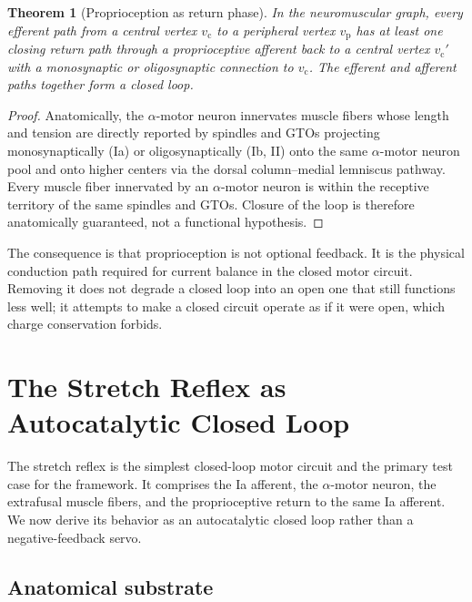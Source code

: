 \documentclass[11pt,twocolumn,a4paper]{article}
\newtheorem{theorem}{Theorem}[section]
\theoremstyle{definition}
\theoremstyle{remark}
\begin{document}
\begin{theorem}[Proprioception as return phase]
\label{thm:prop-return}
In the neuromuscular graph, every efferent path from a central vertex
$v_{\mathrm{c}}$ to a peripheral vertex $v_{\mathrm{p}}$ has at least
one closing return path through a proprioceptive afferent
back to a central vertex $v_{\mathrm{c}}'$ with a monosynaptic or
oligosynaptic connection to $v_{\mathrm{c}}$. The efferent and afferent
paths together form a closed loop.
\end{theorem}

\begin{proof}
Anatomically, the $\alpha$-motor neuron innervates muscle fibers whose
length and tension are directly reported by spindles and GTOs projecting
monosynaptically (Ia) or oligosynaptically (Ib, II) onto the same
$\alpha$-motor neuron pool and onto higher centers via the dorsal
column--medial lemniscus pathway. Every muscle fiber innervated by an
$\alpha$-motor neuron is within the receptive territory of the same
spindles and GTOs. Closure of the loop is therefore anatomically
guaranteed, not a functional hypothesis.
\end{proof}

The consequence is that proprioception is not optional feedback. It
is the physical conduction path required for current balance in the
closed motor circuit. Removing it does not degrade a closed loop into
an open one that still functions less well; it attempts to make a
closed circuit operate as if it were open, which charge conservation
forbids.


\section{The Stretch Reflex as Autocatalytic Closed Loop}
\label{sec:stretch-reflex}

The stretch reflex is the simplest closed-loop motor circuit and the
primary test case for the framework. It comprises the Ia afferent, the
$\alpha$-motor neuron, the extrafusal muscle fibers, and the
proprioceptive return to the same Ia afferent. We now derive its
behavior as an autocatalytic closed loop rather than a negative-feedback
servo.

\subsection{Anatomical substrate}
\end{document}
